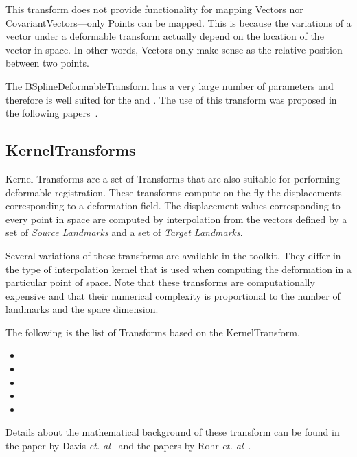 This transform does not provide functionality for mapping Vectors nor
CovariantVectors---only Points can be mapped. This is because the variations
of a vector under a deformable transform actually depend on the location of the
vector in space. In other words, Vectors only make sense as the relative
position between two points.

The BSplineDeformableTransform has a very large number of parameters and
therefore is well suited for the  and
. The use of this transform was proposed in the
following papers~\cite{Rueckert1999,Mattes2001,Mattes2003}.




\subsection{KernelTransforms}
\label{sec:KernelTransforms}

Kernel Transforms are a set of Transforms that are also suitable for performing
deformable registration. These transforms compute on-the-fly the displacements
corresponding to a deformation field. The displacement values corresponding to
every point in space are computed by interpolation from the vectors defined by
a set of \emph{Source Landmarks} and a set of \emph{Target Landmarks}.

Several variations of these transforms are available in the toolkit. They
differ in the type of interpolation kernel that is used when computing the
deformation in a particular point of space. Note that these transforms are
computationally expensive and that their numerical complexity is proportional
to the number of landmarks and the space dimension.

The following is the list of Transforms based on the KernelTransform.

\begin{itemize}
\item {}
\item {}
\item {}
\item {}
\item {}
\end{itemize}

Details about the mathematical background of these transform can be found in
the paper by Davis \emph{et. al}~\cite{Davis1997} and the papers by Rohr
\emph{et. al}~\cite{Rohr1999,Rohr2001}.
